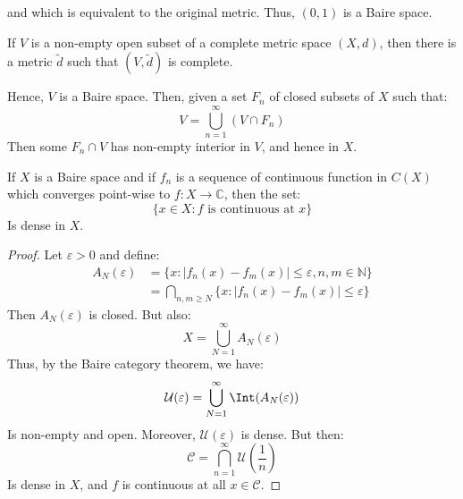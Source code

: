 \documentclass[crop=false,class=article,oneside]{standalone}
\begin{document}
        and which is equivalent to the original metric. Thus,
        $(0,1)$ is a Baire space.
        \begin{theorem}
            If $V$ is a non-empty open subset of a complete metric
            space $(X,d)$, then there is a metric $\tilde{d}$ such
            that $(V,\tilde{d})$ is complete.
        \end{theorem}
        Hence, $V$ is a Baire space. Then, given a set
        $F_{n}$ of closed subsets of $X$ such that:
        \begin{equation}
            V=\bigcup_{n=1}^{\infty}(V\cap{F}_{n})
        \end{equation}
        Then some $F_{n}\cap{V}$ has non-empty interior in $V$,
        and hence in $X$.
        \begin{theorem}
            If $X$ is a Baire space and if $f_{n}$ is a sequence
            of continuous function in $C(X)$ which converges
            point-wise to $f:X\rightarrow\mathbb{C}$, then
            the set:
            \begin{equation}
                \{x\in{X}:f\textrm{ is continuous at }x\}
            \end{equation}
            Is dense in $X$.
        \end{theorem}
        \begin{proof}
            Let $\varepsilon>0$ and define:
            \begin{align}
                A_{N}(\varepsilon)&=
                \{x:|f_{n}(x)-f_{m}(x)|\leq\varepsilon,
                    n,m\in\mathbb{N}\}\\
                &=\bigcap_{n,m\geq{N}}
                    \{x:|f_{n}(x)-f_{m}(x)|\leq\varepsilon\}
            \end{align}
            Then $A_{N}(\varepsilon)$ is closed. But also:
            \begin{equation}
                X=\bigcup_{N=1}^{\infty}A_{N}(\varepsilon)
            \end{equation}
            Thus, by the Baire category theorem, we have:
            \begin{equation}
                \mathcal{U}(\varepsilon)=
                \bigcup_{N=1}^{\infty}\Int(A_{N}(\varepsilon))
            \end{equation}
            Is non-empty and open. Moreover,
            $\mathcal{U}(\varepsilon)$ is dense. But then:
            \begin{equation}
                \mathcal{C}=\bigcap_{n=1}^{\infty}
                \mathcal{U}(\frac{1}{n})
            \end{equation}
            Is dense in $X$, and $f$ is continuous at all
            $x\in\mathcal{C}$.
        \end{proof}
\end{document}
